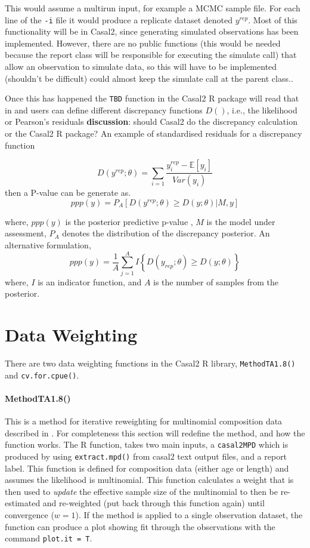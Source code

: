 \documentclass[12pt,preprint,authoryear]{article}
\begin{document}
This would assume a multirun input, for example a MCMC sample file. For each line of the \texttt{-i} file it would produce a replicate dataset denoted \(y^{rep}\). Most of this functionality will be in Casal2, since generating simulated observations has been implemented. However, there are no public functions (this would be needed because the report class will be responsible for executing the simulate call) that allow an observation to simulate data, so this will have to be implemented (shouldn't be difficult) could almost keep the simulate call at the parent class..


Once this has happened the \texttt{TBD} function in the Casal2 R package will read that in and users can define different discrepancy functions \(D()\), i.e., the likelihood or Pearson's residuals \textbf{discussion}: should Casal2 do the discrepancy calculation or the Casal2 R package? An example of standardised residuals for a discrepancy function

\[
D\left(y^{rep}; \theta\right) =\sum_{i = 1} \frac{y_i^{rep} - \mathbb{E}[y_i]}{Var(y_i)}
\]
then a P-value can be generate as.
\[
ppp\left(y\right) = P_A\left[D\left(y^{rep}; \theta\right) \geq D\left(y;\theta\right) | M, y\right]
\]

where, \(ppp\left(y\right)\) is the posterior predictive p-value \cite{hjort2006post}, \(M\) is the model under assessment, \(P_A\) denotes the distribution of the discrepancy posterior. An alternative formulation,
\[
ppp\left(y\right) = \frac{1}{A} \sum\limits_{j = 1}^A I \left\{D\left(y_{rep}; \theta\right) \geq D\left(y;\theta\right) \right\}
\]
where, \(I\) is an indicator function, and \(A\) is the number of samples from the posterior.

\section{Data Weighting}

There are two data weighting functions in the Casal2 R library, \texttt{MethodTA1.8()} and \texttt{cv.for.cpue()}.


\paragraph*{MethodTA1.8()}

This is a method for iterative reweighting for multinomial composition data described in \cite{francis2011data}. For completeness this section will redefine the method, and how the function works. The R function, takes two main inputs, a \texttt{casal2MPD} which is produced by using \texttt{extract.mpd()} from casal2 text output files, and a report label. This function is defined for composition data (either age or length) and assumes the likelihood is multinomial. This function calculates a weight that is then used to \textit{update} the effective sample size of the multinomial to then be re-estimated and re-weighted (put back through this function again) until convergence (\(w = 1\)). If the method is applied to a single observation dataset, the function can produce a plot showing fit through the observations with the command \texttt{plot.it = T}.
\end{document}
